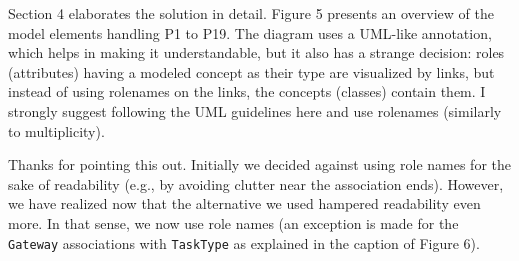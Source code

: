 \documentclass[10pt]{article}
\begin{document}
\begin{response}{Section 4 elaborates the solution in detail. Figure 5 presents an overview of the model elements handling P1 to P19. The diagram uses a UML-like annotation, which helps in making it understandable, but it also has a strange decision: roles (attributes) having a modeled concept as their type are visualized by links, but instead of using rolenames on the links, the concepts (classes) contain them. I strongly suggest following the UML guidelines here and use rolenames (similarly to multiplicity).}

Thanks for pointing this out. Initially we decided against using role names for the sake of readability (e.g., by avoiding clutter near the association ends). However, we have realized now that the alternative we used hampered readability even more. In that sense, we now use role names (an exception is made for the \texttt{Gateway} associations with \texttt{TaskType} as explained in the caption of Figure 6).

\end{response}

\end{document}
